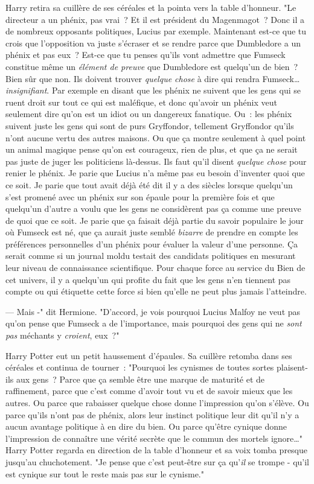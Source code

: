 Harry retira sa cuillère de ses céréales et la pointa vers la table d'honneur. "Le directeur a un phénix, pas vrai~? Et il est président du Magenmagot~? Donc il a de nombreux opposants politiques, Lucius par exemple. Maintenant est-ce que tu crois que l'opposition va juste s'écraser et se rendre parce que Dumbledore a un phénix et pas eux~? Est-ce que tu penses qu'ils vont admettre que Fumseck constitue même un \emph{élément de preuve} que Dumbledore est quelqu'un de bien~? Bien sûr que non. Ils doivent trouver \emph{quelque chose} à dire qui rendra Fumseck… \emph{insignifiant}. Par exemple en disant que les phénix ne suivent que les gens qui se ruent droit sur tout ce qui est maléfique, et donc qu'avoir un phénix veut seulement dire qu'on est un idiot ou un dangereux fanatique. Ou~: les phénix suivent juste les gens qui sont de purs Gryffondor, tellement Gryffondor qu'ils n'ont aucune vertu des autres maisons. Ou que ça montre seulement à quel point un animal magique pense qu'on est courageux, rien de plus, et que ça ne serait pas juste de juger les politiciens là-dessus. Ils faut qu'il disent \emph{quelque chose} pour renier le phénix. Je parie que Lucius n'a même pas eu besoin d'inventer quoi que ce soit. Je parie que tout avait déjà été dit il y a des siècles lorsque quelqu'un s'est promené avec un phénix sur son épaule pour la première fois et que quelqu'un d'autre a voulu que les gens ne considèrent pas ça comme une preuve de quoi que ce soit. Je parie que ça faisait déjà partie du savoir populaire le jour où Fumseck est né, que ça aurait juste semblé \emph{bizarre} de prendre en compte les préférences personnelles d'un phénix pour évaluer la valeur d'une personne. Ça serait comme si un journal moldu testait des candidats politiques en mesurant leur niveau de connaissance scientifique. Pour chaque force au service du Bien de cet univers, il y a quelqu'un qui profite du fait que les gens n'en tiennent pas compte ou qui étiquette cette force si bien qu'elle ne peut plus jamais l'atteindre.

--- Mais -" dit Hermione. "D'accord, je vois pourquoi Lucius Malfoy ne veut pas qu'on pense que Fumseck a de l'importance, mais pourquoi des gens qui ne \emph{sont pas} méchants y \emph{croient}, eux~?"

Harry Potter eut un petit haussement d'épaules. Sa cuillère retomba dans ses céréales et continua de tourner~: "Pourquoi les cynismes de toutes sortes plaisent-ils aux gens~? Parce que ça semble être une marque de maturité et de raffinement, parce que c'est comme d'avoir tout vu et de savoir mieux que les autres. Ou parce que rabaisser quelque chose donne l'impression qu'on s'élève. Ou parce qu'ils n'ont pas de phénix, alors leur instinct politique leur dit qu'il n'y a aucun avantage politique à en dire du bien. Ou parce qu'être cynique donne l'impression de connaître une vérité secrète que le commun des mortels ignore…" Harry Potter regarda en direction de la table d'honneur et sa voix tomba presque jusqu'au chuchotement. "Je pense que c'est peut-être sur ça qu'\emph{il} se trompe - qu'il est cynique sur tout le reste mais pas sur le cynisme."

